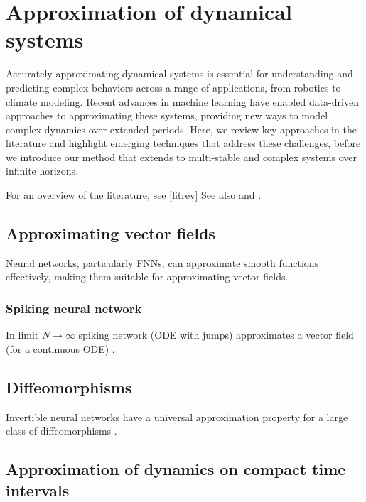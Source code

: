 \documentclass{article}
\theoremstyle{definition}
\theoremstyle{remark}
\begin{document}
\section{Approximation of dynamical systems}

Accurately approximating dynamical systems is essential for understanding and predicting complex behaviors across a range of applications, from robotics to climate modeling.
Recent advances in machine learning have enabled data-driven approaches to approximating these systems, providing new ways to model complex dynamics over extended periods.
Here, we review key approaches in the literature and highlight emerging techniques that address these challenges, before we introduce our method that extends to multi-stable and complex systems over infinite horizons.

For an overview of the literature, see [litrev]
See also \citep{li2022approximation} and \citep{jiang2023brief}.




\subsection{Approximating vector fields}
Neural networks, particularly FNNs, can approximate smooth functions effectively, making them suitable for approximating vector fields.

\subsubsection{Spiking neural network}
In limit $N\rightarrow\infty$ spiking network (ODE with jumps) approximates a vector field (for a continuous ODE) \citep{podlaski2024approximating}. 



\subsection{Diffeomorphisms}
Invertible neural networks have a universal approximation property for a  large class of diffeomorphisms   \citep{ishikawa2023universal}.




\subsection{Approximation of dynamics on compact time intervals}
\end{document}
